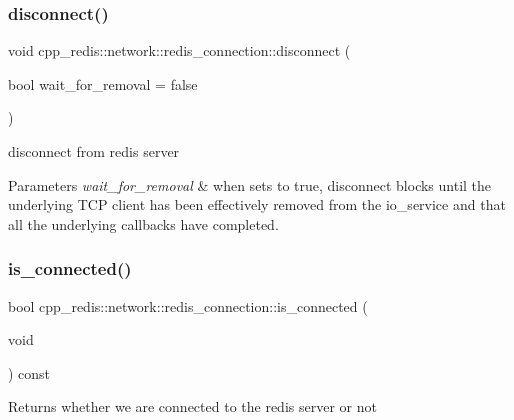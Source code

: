 \subsubsection{\texorpdfstring{disconnect()}{disconnect()}}
{\footnotesize\ttfamily void cpp\+\_\+redis\+::network\+::redis\+\_\+connection\+::disconnect (\begin{DoxyParamCaption}\item[{bool}]{wait\+\_\+for\+\_\+removal = {\ttfamily false} }\end{DoxyParamCaption})}

disconnect from redis server


\begin{DoxyParams}{Parameters}
{\em wait\+\_\+for\+\_\+removal} & when sets to true, disconnect blocks until the underlying T\+CP client has been effectively removed from the io\+\_\+service and that all the underlying callbacks have completed. \\
\hline
\end{DoxyParams}
\mbox{\label{classcpp__redis_1_1network_1_1redis__connection_ad3d96826e2e67fb3fed23280237d4d9c}} 
\subsubsection{\texorpdfstring{is\+\_\+connected()}{is\_connected()}}
{\footnotesize\ttfamily bool cpp\+\_\+redis\+::network\+::redis\+\_\+connection\+::is\+\_\+connected (\begin{DoxyParamCaption}\item[{void}]{ }\end{DoxyParamCaption}) const}

\begin{DoxyReturn}{Returns}
whether we are connected to the redis server or not 
\end{DoxyReturn}
\mbox{\label{classcpp__redis_1_1network_1_1redis__connection_a98c163ce431e85e46e139211564b7b3f}} 
